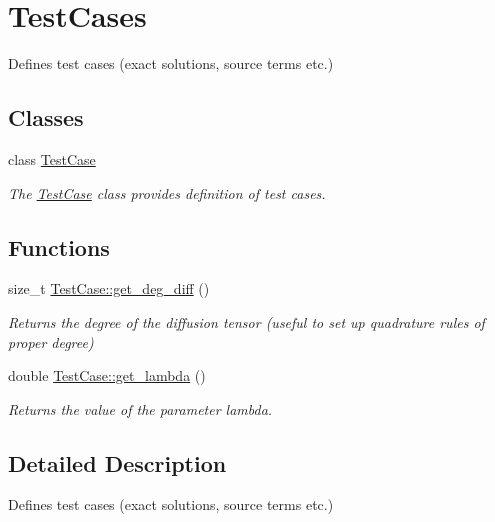 \hypertarget{group__TestCases}{}\section{Test\+Cases}
\label{group__TestCases}


Defines test cases (exact solutions, source terms etc.)  


\subsection*{Classes}
\begin{DoxyCompactItemize}
\item 
class \hyperlink{classTestCase}{Test\+Case}
\begin{DoxyCompactList}\small\item\em The \hyperlink{classTestCase}{Test\+Case} class provides definition of test cases. \end{DoxyCompactList}\end{DoxyCompactItemize}
\subsection*{Functions}
\begin{DoxyCompactItemize}
\item 
\mbox{\label{group__TestCases_ga3dd2daaebb012281b252ab65db0045b2}} 
size\+\_\+t \hyperlink{group__TestCases_ga3dd2daaebb012281b252ab65db0045b2}{Test\+Case\+::get\+\_\+deg\+\_\+diff} ()
\begin{DoxyCompactList}\small\item\em Returns the degree of the diffusion tensor (useful to set up quadrature rules of proper degree) \end{DoxyCompactList}\item 
\mbox{\label{group__TestCases_gabb42d3b206c5e89d34ed34f5fe2546e0}} 
double \hyperlink{group__TestCases_gabb42d3b206c5e89d34ed34f5fe2546e0}{Test\+Case\+::get\+\_\+lambda} ()
\begin{DoxyCompactList}\small\item\em Returns the value of the parameter lambda. \end{DoxyCompactList}\end{DoxyCompactItemize}


\subsection{Detailed Description}
Defines test cases (exact solutions, source terms etc.) 

